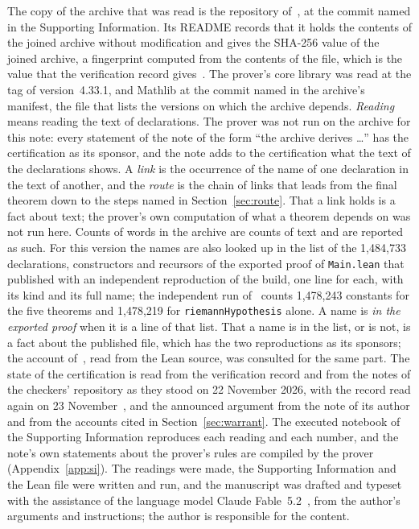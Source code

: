 \documentclass[11pt]{article}
\theoremstyle{definition}
\theoremstyle{remark}
\DeclareRobustCommand{\lean}[1]{{\renewcommand{\_}{\textunderscore\allowbreak}\texttt{#1}}}
\begin{document}
The copy of the archive that was read is the repository of~\citet{mirror}, at the commit named in the Supporting Information. Its README records that it holds the contents of the joined archive without modification and gives the SHA-256 value of the joined archive, a fingerprint computed from the contents of the file, which is the value that the verification record gives~\citep{sutherland}. The prover's core library was read at the tag of version~4.33.1, and Mathlib at the commit named in the archive's manifest, the file that lists the versions on which the archive depends. \emph{Reading} means reading the text of declarations. The prover was not run on the archive for this note: every statement of the note of the form ``the archive derives \dots'' has the certification as its sponsor, and the note adds to the certification what the text of the declarations shows. A \emph{link} is the occurrence of the name of one declaration in the text of another, and the \emph{route} is the chain of links that leads from the final theorem down to the steps named in Section~\ref{sec:route}. That a link holds is a fact about text; the prover's own computation of what a theorem depends on was not run here. Counts of words in the archive are counts of text and are reported as such. For this version the names are also looked up in the list of the 1{,}484{,}733 declarations, constructors and recursors of the exported proof of \lean{Main.lean} that~\citet{dixit} published with an independent reproduction of the build, one line for each, with its kind and its full name; the independent run of~\citet{lipponen} counts 1{,}478{,}243 constants for the five theorems and 1{,}478{,}219 for \lean{riemannHypothesis} alone. A name is \emph{in the exported proof} when it is a line of that list. That a name is in the list, or is not, is a fact about the published file, which has the two reproductions as its sponsors; the account of~\citet{vincit}, read from the Lean source, was consulted for the same part. The state of the certification is read from the verification record and from the notes of the checkers' repository as they stood on 22 November 2026, with the record read again on 23 November~\citep{sutherland,leannotes}, and the announced argument from the note of its author and from the accounts cited in Section~\ref{sec:warrant}. The executed notebook of the Supporting Information reproduces each reading and each number, and the note's own statements about the prover's rules are compiled by the prover (Appendix~\ref{app:si}). The readings were made, the Supporting Information and the Lean file were written and run, and the manuscript was drafted and typeset with the assistance of the language model Claude Fable~5.2~\citep{claude}, from the author's arguments and instructions; the author is responsible for the content.
\end{document}
